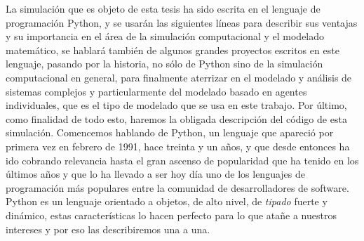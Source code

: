 La simulación que es objeto de esta tesis ha sido escrita en el lenguaje de programación Python, y se usarán las siguientes líneas  para describir sus ventajas y su importancia en el área de la simulación computacional y el modelado matemático, se hablará también de algunos grandes proyectos escritos en este lenguaje, pasando por la historia, no sólo de Python sino de la simulación computacional en general, para finalmente aterrizar en el modelado y análisis de sistemas complejos y particularmente del modelado basado en agentes individuales, que es el tipo de modelado que se usa en este trabajo. Por último, como finalidad de todo esto, haremos la obligada descripción del código de esta simulación.
Comencemos hablando de Python, un lenguaje que apareció por primera vez en febrero de 1991, hace treinta y un años, y que desde entonces ha ido cobrando relevancia hasta el gran ascenso de popularidad que ha tenido en los últimos años y que lo ha llevado a ser hoy día uno de los lenguajes de programación más populares entre la comunidad de desarrolladores de software. Python es un lenguaje orientado a objetos, de alto nivel, de \textit{tipado} fuerte y dinámico, estas características lo hacen perfecto para lo que atañe a nuestros intereses y por eso las describiremos una a una.
